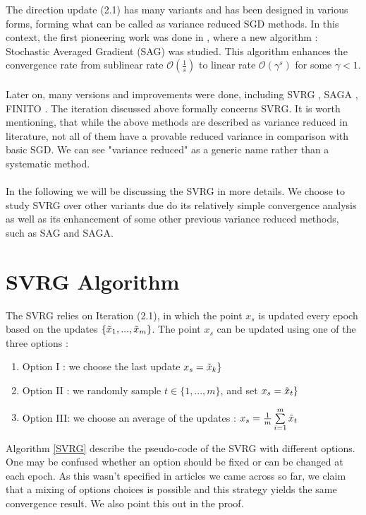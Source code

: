\documentclass[12pt]{report}
\begin{document}
The direction update (2.1) has many variants and has been designed in various forms, forming what can be called as variance reduced SGD methods. In this context, the first pioneering work was done in \cite{schmidt2017minimizing}, where a new algorithm : Stochastic Averaged Gradient (SAG) was studied. This algorithm enhances the convergence rate from sublinear rate $\mathcal{O}(\frac{1}{s})$ to linear rate $\mathcal{O}(\gamma^s)$ for some $\gamma<1$. \\
\\Later on, many versions and improvements were done, including SVRG \cite{johnson2013accelerating}, SAGA \cite{defazio2014saga}, FINITO \cite{defazio2014finito}.
The iteration discussed above formally concerns SVRG.
It is worth mentioning, that while the above methods are described as variance reduced in literature, not all of them have a provable reduced variance in comparison with basic SGD. We can see "variance reduced" as a generic name rather than a systematic method. \\
\\In the following we will be discussing the SVRG in more details. We choose to study SVRG over other variants due do its relatively simple convergence analysis as well as its enhancement of some other previous variance reduced methods, such as SAG and SAGA.


\section{SVRG Algorithm}
The SVRG relies on Iteration (2.1), in which the point $x_s$ is updated every epoch based on the updates $\{\Tilde{x}_1,...,\Tilde{x}_m\}$. The point $x_s$ can be updated using one of the three options : 
\begin{enumerate}
    \item Option I : we choose the last update $x_s=\Tilde{x}_k\}$
    \item Option II : we randomly sample $t\in\{1,...,m\}$, and set $x_s=\Tilde{x}_t\}$
    \item Option III: we choose an average of the updates : $x_s=\frac{1}{m}\sum\limits_{i=1}^m \Tilde{x}_t$ 
\end{enumerate}
Algorithm \ref{SVRG} describe the pseudo-code of the SVRG with different options. One may be confused whether an option should be fixed or can be changed at each epoch. As this wasn't specified in articles we came across so far, we claim that a mixing of options choices is possible and this strategy yields the same convergence result. We also point this out in the proof.
\end{document}
